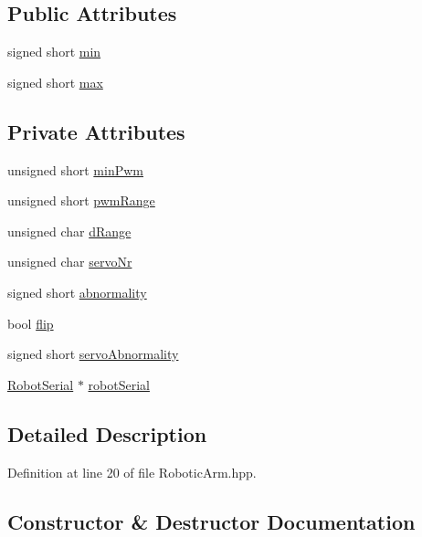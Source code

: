 \subsection*{Public Attributes}
\begin{DoxyCompactItemize}
\item 
signed short \hyperlink{struct_servo_a2fe3506ea048af600250b292275df6e2}{min}
\item 
signed short \hyperlink{struct_servo_a20a1e16e912d613a6f7ee07072799f6d}{max}
\end{DoxyCompactItemize}
\subsection*{Private Attributes}
\begin{DoxyCompactItemize}
\item 
unsigned short \hyperlink{struct_servo_a209ccc691c719c1442f77a0c0ee08fbb}{min\+Pwm}
\item 
unsigned short \hyperlink{struct_servo_ad3b5b2cb998a334baeb520cecc24be48}{pwm\+Range}
\item 
unsigned char \hyperlink{struct_servo_a534d23b4cf1dcdd677dfa503101c50a0}{d\+Range}
\item 
unsigned char \hyperlink{struct_servo_a0795bd3f3c8d44e1818ffd653a7484d5}{servo\+Nr}
\item 
signed short \hyperlink{struct_servo_a65a5e86b2f31ec2a9c115e818a1ea703}{abnormality}
\item 
bool \hyperlink{struct_servo_a4b94c914128a9965e264f0be608fb6a7}{flip}
\item 
signed short \hyperlink{struct_servo_a0876d7d53f6e32cd75fa8ead3c274ead}{servo\+Abnormality}
\item 
\hyperlink{class_robot_serial}{Robot\+Serial} $\ast$ \hyperlink{struct_servo_a07e75a2dc8f979d2d91308da2ae96053}{robot\+Serial}
\end{DoxyCompactItemize}


\subsection{Detailed Description}


Definition at line 20 of file Robotic\+Arm.\+hpp.



\subsection{Constructor \& Destructor Documentation}

